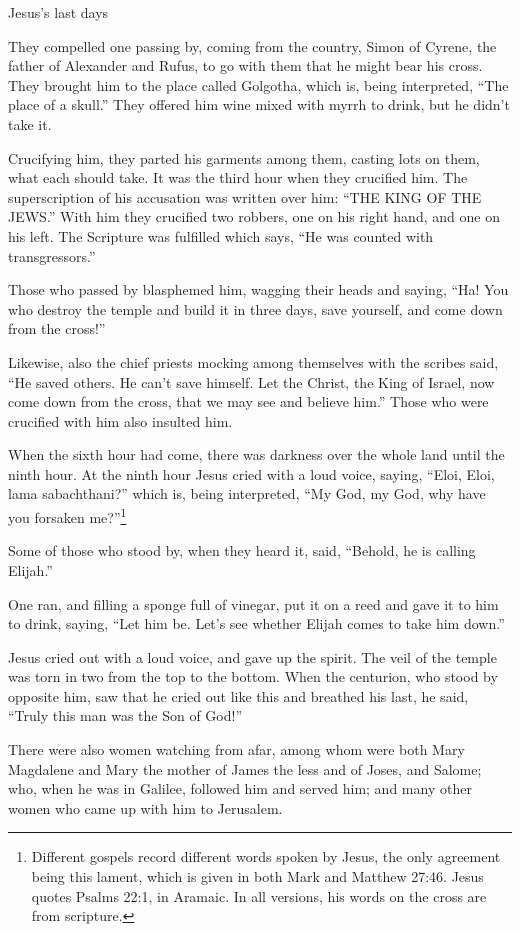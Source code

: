\documentclass[10pt,twoside]{article} %
\begin{document}
\begin{section}{Jesus's last days}
{  They compelled one passing by, coming from the country, Simon of Cyrene, the father of Alexander and Rufus, to go with them that he might bear his cross.   They brought him to the place called Golgotha, which is, being interpreted, ``The place of a skull.''   They offered him wine mixed with myrrh to drink, but he didn't take it.

  Crucifying him, they parted his garments among them, casting lots on them, what each should take.   It was the third hour when they crucified him.   The superscription of his accusation was written over him: ``THE KING OF THE JEWS.''   With him they crucified two robbers, one on his right hand, and one on his left.   The Scripture was fulfilled which says, ``He was counted with transgressors.''

  Those who passed by blasphemed him, wagging their heads and saying, ``Ha! You who destroy the temple and build it in three days,   save yourself, and come down from the cross!''

  Likewise, also the chief priests mocking among themselves with the scribes said, ``He saved others. He can't save himself.   Let the Christ, the King of Israel, now come down from the cross, that we may see and believe him.'' Those who were crucified with him also insulted him.

  When the sixth hour had come, there was darkness over the whole land until the ninth hour.   At the ninth hour Jesus cried with a loud voice, saying, ``Eloi, Eloi, lama sabachthani?'' which is, being interpreted, ``My God, my God, why have
you forsaken me?''\footnote{Different gospels record different words spoken by Jesus, the only agreement being this lament, which is
given in both Mark and Matthew 27:46. Jesus quotes Psalms 22:1, in Aramaic. In all versions, his words on the cross are from scripture.}

  Some of those who stood by, when they heard it, said, ``Behold, he is calling Elijah.''

  One ran, and filling a sponge full of vinegar, put it on a reed and gave it to him to drink, saying, ``Let him be. Let's see whether Elijah comes to take him down.''

  Jesus cried out with a loud voice, and gave up the spirit.   The veil of the temple was torn in two from the top to the bottom.   When the centurion, who stood by opposite him, saw that he cried out like this and breathed his last, he said, ``Truly this man was the Son of God!''

  There were also women watching from afar, among whom were both Mary Magdalene and Mary the mother of James the less and of Joses, and Salome;   who, when he was in Galilee, followed him and served him; and many other women who came up with him to Jerusalem.
}


\end{section}
\end{document}
